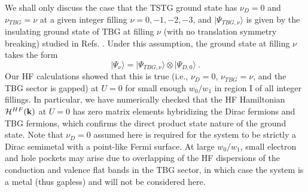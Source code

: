 \documentclass[prb,aps,nofootinbib,amssymb,twocolumn,superscriptaddress,10pt]{revtex4-2}
\begin{document}
\begin{widetext}
We shall only discuss the case that the TSTG ground state has $\nu_D=0$ and $\nu_{TBG}=\nu$ at a given integer filling $\nu=0,-1,-2,-3$, and $|\Psi_{TBG,\nu}\rangle$ is given by the insulating ground state of TBG at filling $\nu$ (with no translation symmetry breaking) studied in Refs. \cite{BUL20,LIA20}. Under this assumption, the ground state at filling $\nu$ takes the form
\begin{equation}\label{seq:prodU=0}
|\Psi_\nu\rangle=|\Psi_{TBG,\nu}\rangle\otimes|\Psi_{D,0}\rangle\ .
\end{equation}
Our HF calculations showed that this is true (i.e., $\nu_D=0$, $\nu_{TBG}=\nu$, and the TBG sector is gapped) at $U=0$ for small enough $w_0/w_1$ in region I of all integer fillings. In particular, we have numerically checked that the HF Hamiltonian $\mathcal{H}^{HF}(\mathbf{k})$ at $U = 0$ has zero matrix elements hybridizing the Dirac fermions and TBG fermions, which confirms the direct product state nature of the ground state. Note that $\nu_D=0$ assumed here is required for the system to be strictly a Dirac semimetal with a point-like Fermi surface. At large $w_0/w_1$, small electron and hole pockets may arise due to overlapping of the HF dispersions of the conduction and valence flat bands in the TBG sector, in which case the system is a metal (thus gapless) and will not be considered here.


\end{widetext}
\end{document}
